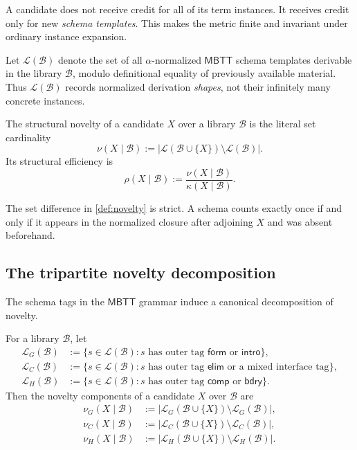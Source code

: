\documentclass{lmcs}
\newcommand{\B}{\mathcal{B}}
\newcommand{\Lcal}{\mathcal{L}}
\newcommand{\MBTT}{\mathsf{MBTT}}
\begin{document}
A candidate does not receive credit for all of its term instances. It receives credit only for new \emph{schema templates}. This makes the metric finite and invariant under ordinary instance expansion.

\begin{defi}
\label{def:closure}
Let $\Lcal(\B)$ denote the set of all $\alpha$-normalized $\MBTT$ schema templates derivable in the library $\B$, modulo definitional equality of previously available material. Thus $\Lcal(\B)$ records normalized derivation \emph{shapes}, not their infinitely many concrete instances.
\end{defi}

\begin{defi}
\label{def:novelty}
The structural novelty of a candidate $X$ over a library $\B$ is the literal set cardinality
\[
  \nu(X\mid\B) := |\Lcal(\B \cup \{X\}) \setminus \Lcal(\B)|.
\]
Its structural efficiency is
\[
  \rho(X\mid\B) := \frac{\nu(X\mid\B)}{\kappa(X\mid\B)}.
\]
\end{defi}

The set difference in \autoref{def:novelty} is strict. A schema counts exactly once if and only if it appears in the normalized closure after adjoining $X$ and was absent beforehand.

\subsection{The tripartite novelty decomposition}

The schema tags in the $\MBTT$ grammar induce a canonical decomposition of novelty.

\begin{defi}
\label{def:tripartite}
For a library $\B$, let
\begin{align*}
\Lcal_G(\B) &:= \{ s \in \Lcal(\B) : \text{$s$ has outer tag $\mathsf{form}$ or $\mathsf{intro}$} \},\\
\Lcal_C(\B) &:= \{ s \in \Lcal(\B) : \text{$s$ has outer tag $\mathsf{elim}$ or a mixed interface tag} \},\\
\Lcal_H(\B) &:= \{ s \in \Lcal(\B) : \text{$s$ has outer tag $\mathsf{comp}$ or $\mathsf{bdry}$} \}.
\end{align*}
Then the novelty components of a candidate $X$ over $\B$ are
\begin{align*}
\nu_G(X\mid\B) &:= |\Lcal_G(\B\cup\{X\}) \setminus \Lcal_G(\B)|,\\
\nu_C(X\mid\B) &:= |\Lcal_C(\B\cup\{X\}) \setminus \Lcal_C(\B)|,\\
\nu_H(X\mid\B) &:= |\Lcal_H(\B\cup\{X\}) \setminus \Lcal_H(\B)|.
\end{align*}
\end{defi}
\end{document}
